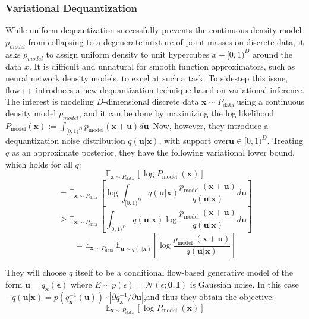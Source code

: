 \documentclass[]{IEEEtran}
\begin{document}
\subsubsection{ Variational Dequantization }
While uniform dequantization successfully prevents the continuous density model $p_{model}$ from collapsing to a degenerate mixture of point masses on discrete data, it asks $p_{model}$ to assign uniform density to unit hypercubes $x+[0,1)^{D}$ around the data $x$. It is difficult and unnatural for smooth function approximators, such as neural network density models, to excel at such a task. To sidestep this issue, flow++ introduces a new dequantization technique based on variational inference. 
The interest is modeling $D$-dimensional discrete data $\mathbf{x} \sim P_{\text {data }}$using a continuous density model $p_{model}$, and it can be done by maximizing the log likelihood $P_{\operatorname{model}}(\mathbf{x}):=\int_{[0,1)^{D}} p_{\operatorname{model}}(\mathbf{x}+\mathbf{u}) d \mathbf{u}$~Now, however, they introduce a dequantization noise distribution $q(\mathbf{u} | \mathbf{x})$, with support over$\mathbf{u} \in[0,1)^{D}$. Treating $q$ as an approximate posterior, they have the following variational lower bound, which holds for all $q$: 
\begin{equation}
\mathbb{E}_{\mathbf{x} \sim P_{\text {data }}}\left[\log P_{\text {model }}(\mathbf{x})\right]
\label{fpp07}
\end{equation}
\begin{equation}
=\mathbb{E}_{\mathbf{x} \sim P_{\text {data }}}\left[\log \int_{[0,1)^{D}} q(\mathbf{u} | \mathbf{x}) \frac{p_{\text {model }}(\mathbf{x}+\mathbf{u})}{q(\mathbf{u} | \mathbf{x})} d \mathbf{u}\right]
\label{fpp08}
\end{equation}
\begin{equation}
\geq \mathbb{E}_{\mathbf{x} \sim P_{\text {data }}}\left[\int_{[0,1)^{D}} q(\mathbf{u} | \mathbf{x}) \log \frac{p_{\text {model }}(\mathbf{x}+\mathbf{u})}{q(\mathbf{u} | \mathbf{x})} d \mathbf{u}\right]
\label{fpp09}
\end{equation}
\begin{equation}
=\mathbb{E}_{\mathbf{x} \sim P_{\text {data }}} \mathbb{E}_{\mathbf{u} \sim q(\cdot | \mathbf{x})}\left[\log \frac{p_{\text {model }}(\mathbf{x}+\mathbf{u})}{q(\mathbf{u} | \mathbf{x})}\right]
\label{fpp10}
\end{equation}

They will choose $q$ itself to be a conditional flow-based generative model of the form  $\mathbf{u}=q_{\mathbf{x}}(\boldsymbol{\epsilon})$ where $E \sim p(\epsilon)=\mathcal{N}(\epsilon ; \mathbf{0}, \mathbf{I})$ is Gaussian noise. In this case $-q(\mathbf{u} | \mathbf{x})=p\left(q_{\mathbf{x}}^{-1}(\mathbf{u})\right) \cdot\left|\partial q_{\mathbf{x}}^{-1} / \partial \mathbf{u}\right|$,and thus they obtain the objective:
\begin{equation}
\mathbb{E}_{\mathbf{x} \sim P_{\text {data }}}\left[\log P_{\text {model }}(\mathbf{x})\right]
\label{fpp11}
\end{equation}
\end{document}

